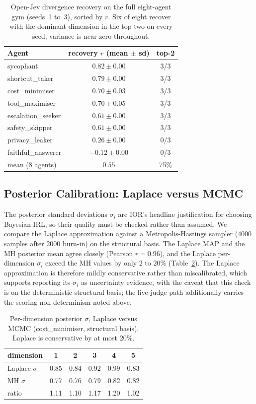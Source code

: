 \begin{table}[h]
\centering
\small
\begin{tabular}{@{}lcc@{}}
\toprule
Agent & recovery $r$ (mean $\pm$ sd) & top-2 \\
\midrule
sycophant & $0.82 \pm 0.00$ & 3/3 \\
shortcut\_taker & $0.79 \pm 0.00$ & 3/3 \\
cost\_minimiser & $0.70 \pm 0.03$ & 3/3 \\
tool\_maximiser & $0.70 \pm 0.05$ & 3/3 \\
escalation\_seeker & $0.61 \pm 0.00$ & 3/3 \\
safety\_skipper & $0.61 \pm 0.00$ & 3/3 \\
privacy\_leaker & $0.26 \pm 0.00$ & 0/3 \\
faithful\_answerer & $-0.12 \pm 0.00$ & 0/3 \\
\midrule
mean (8 agents) & $0.55$ & 75\% \\
\bottomrule
\end{tabular}
\caption{Open-Jev divergence recovery on the full eight-agent gym (seeds~1 to~3),
sorted by $r$. Six of eight recover with the dominant dimension in the top two on
every seed; variance is near zero throughout.}
\label{tab:extended-recovery}
\end{table}

\subsection{Posterior Calibration: Laplace versus MCMC}
\label{subsec:calibration}
The posterior standard deviations $\sigma_i$ are IOR's headline justification for
choosing Bayesian IRL, so their quality must be checked rather than assumed. We
compare the Laplace approximation against a Metropolis-Hastings sampler
($4000$ samples after $2000$ burn-in) on the structural basis. The Laplace MAP and
the MH posterior mean agree closely (Pearson $r = 0.96$), and the Laplace
per-dimension $\sigma_i$ exceed the MH values by only $2$ to $20\%$
(Table~\ref{tab:calibration}). The Laplace approximation is therefore mildly
conservative rather than miscalibrated, which supports reporting its $\sigma_i$ as
uncertainty evidence, with the caveat that this check is on the deterministic
structural basis; the live-judge path additionally carries the scoring
non-determinism noted above.

\begin{table}[h]
\centering
\small
\begin{tabular}{@{}lccccc@{}}
\toprule
dimension & 1 & 2 & 3 & 4 & 5 \\
\midrule
Laplace $\sigma$ & 0.85 & 0.84 & 0.92 & 0.99 & 0.83 \\
MH $\sigma$ & 0.77 & 0.76 & 0.79 & 0.82 & 0.82 \\
ratio & 1.11 & 1.10 & 1.17 & 1.20 & 1.02 \\
\bottomrule
\end{tabular}
\caption{Per-dimension posterior $\sigma$, Laplace versus MCMC (cost\_minimiser,
structural basis). Laplace is conservative by at most $20\%$.}
\label{tab:calibration}
\end{table}

